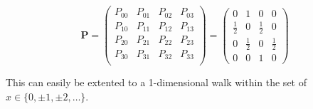 \documentclass[a4paper,12pt]{article}
\begin{document}
\begin{itemize}
\begin{equation*}
 \mathbf{P} = \begin{pmatrix}
               P_{00} & P_{01} & P_{02} & P_{03} \\
               P_{10} & P_{11} & P_{12} & P_{13} \\
               P_{20} & P_{21} & P_{22} & P_{23} \\
               P_{30} & P_{31} & P_{32} & P_{33} \\
              \end{pmatrix}
              =
              \begin{pmatrix}
               0 & 1 & 0 & 0 \\
               \frac{1}{2} & 0 & \frac{1}{2} & 0 \\
               0 & \frac{1}{2} & 0 & \frac{1}{2} \\
               0 & 0 & 1 & 0
              \end{pmatrix}
\end{equation*}

This can easily be extented to a 1-dimensional walk within the set of $x \in \{0, \pm 1, \pm 2, \dots\}$.
\end{itemize}


\end{document}
